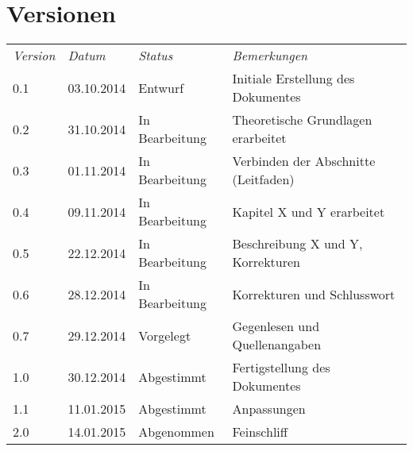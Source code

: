 \chapter*{Versionen}
\label{chap:versions}

\bgroup{}
\fontsize{9pt}{1em}\selectfont
\begin{tabular}{>{\hspace{-0.5pc}}l l l l}
\textit{Version}    & \textit{Datum}   & \textit{Status}      & \textit{Bemerkungen}\\
0.1                 & 03.10.2014       & Entwurf              & Initiale Erstellung des Dokumentes\\
0.2                 & 31.10.2014       & In Bearbeitung       & Theoretische Grundlagen erarbeitet \\
0.3                 & 01.11.2014       & In Bearbeitung       & Verbinden der Abschnitte (Leitfaden)\\
0.4                 & 09.11.2014       & In Bearbeitung       & Kapitel X und Y erarbeitet\\
0.5                 & 22.12.2014       & In Bearbeitung       & Beschreibung X und Y, Korrekturen\\
0.6                 & 28.12.2014       & In Bearbeitung       & Korrekturen und Schlusswort\\
0.7                 & 29.12.2014       & Vorgelegt            & Gegenlesen und Quellenangaben\\
1.0                 & 30.12.2014       & Abgestimmt           & Fertigstellung des Dokumentes\\
1.1                 & 11.01.2015       & Abgestimmt           & Anpassungen\\
2.0                 & 14.01.2015       & Abgenommen           & Feinschliff\\
\end{tabular}
\egroup{}
